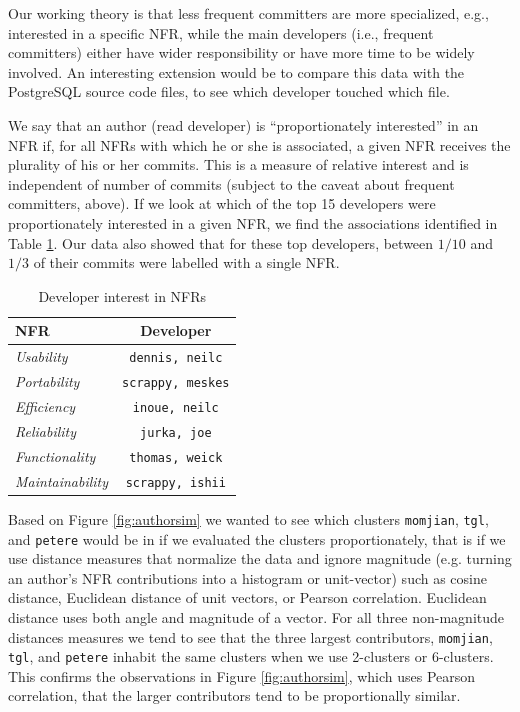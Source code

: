 \documentclass[smallextended]{svjour3}       %
\begin{document}
Our working theory is that less frequent committers are more
specialized, e.g., interested in a specific NFR, while the main developers (i.e., frequent committers) either have wider responsibility or have more
time to be widely involved. An interesting extension would be to compare this data with 
the PostgreSQL source code files, to see which developer touched which file.

We say that an author (read developer) is ``proportionately interested'' in an NFR if, for all NFRs with which he or she is associated, a given NFR receives the plurality of his or her commits. This is a measure of relative interest and is independent of number of commits (subject to the caveat about frequent committers, above).
If we look at which of the top 15 developers were proportionately interested in a given NFR, we find the associations identified in Table \ref{tbl:devinterest}. Our data also showed that for these top developers, between $1/10$ and $1/3$ of their commits were labelled with a single NFR.

\begin{table}
\centering
\begin{tabular}{l|c}
\toprule
\textbf{NFR} & \textbf{Developer} \\
\midrule
\emph{Usability} & \texttt{dennis, neilc} \\
\emph{Portability} & \texttt{scrappy, meskes} \\
\emph{Efficiency} & \texttt{inoue, neilc} \\
\emph{Reliability} & \texttt{jurka, joe} \\
\emph{Functionality} & \texttt{thomas, weick} \\
\emph{Maintainability} & \texttt{scrappy, ishii}\\
\bottomrule
\end{tabular}
	\caption{Developer interest in NFRs}
	\label{tbl:devinterest}
\end{table}

Based on Figure \ref{fig:authorsim} we wanted to see which clusters
\texttt{momjian}, \texttt{tgl}, and \texttt{petere} would be in if we
evaluated the clusters proportionately, that is if we use distance
measures that normalize the data and ignore magnitude (e.g. turning an
author's NFR contributions into a histogram or unit-vector) such as
cosine distance, Euclidean distance of unit vectors, or Pearson
correlation. Euclidean distance uses both angle and magnitude of a
vector. For all three non-magnitude distances measures we tend to see that
the three largest contributors, \texttt{momjian}, \texttt{tgl}, and
\texttt{petere} inhabit the same clusters when we use 2-clusters or 6-clusters. This confirms the observations in
Figure \ref{fig:authorsim}, which uses Pearson correlation, that the larger contributors tend to be
proportionally similar.
\end{document}
